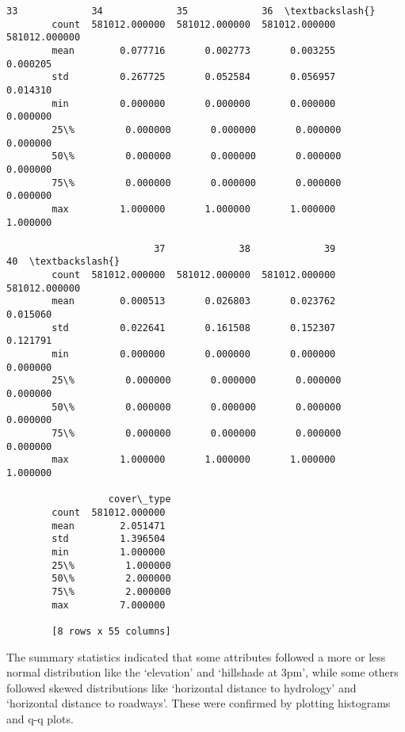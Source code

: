 \documentclass[11pt]{article}
\begin{document}
\begin{Verbatim}[commandchars=\\\{\}]
                          33             34             35             36  \textbackslash{}
        count  581012.000000  581012.000000  581012.000000  581012.000000   
        mean        0.077716       0.002773       0.003255       0.000205   
        std         0.267725       0.052584       0.056957       0.014310   
        min         0.000000       0.000000       0.000000       0.000000   
        25\%         0.000000       0.000000       0.000000       0.000000   
        50\%         0.000000       0.000000       0.000000       0.000000   
        75\%         0.000000       0.000000       0.000000       0.000000   
        max         1.000000       1.000000       1.000000       1.000000   
        
                          37             38             39             40  \textbackslash{}
        count  581012.000000  581012.000000  581012.000000  581012.000000   
        mean        0.000513       0.026803       0.023762       0.015060   
        std         0.022641       0.161508       0.152307       0.121791   
        min         0.000000       0.000000       0.000000       0.000000   
        25\%         0.000000       0.000000       0.000000       0.000000   
        50\%         0.000000       0.000000       0.000000       0.000000   
        75\%         0.000000       0.000000       0.000000       0.000000   
        max         1.000000       1.000000       1.000000       1.000000   
        
                  cover\_type  
        count  581012.000000  
        mean        2.051471  
        std         1.396504  
        min         1.000000  
        25\%         1.000000  
        50\%         2.000000  
        75\%         2.000000  
        max         7.000000  
        
        [8 rows x 55 columns]
\end{Verbatim}
            
    The summary statistics indicated that some attributes followed a more or
less normal distribution like the `elevation' and `hillshade at 3pm',
while some others followed skewed distributions like `horizontal
distance to hydrology' and `horizontal distance to roadways'. These were
confirmed by plotting histograms and q-q plots.
\end{document}
